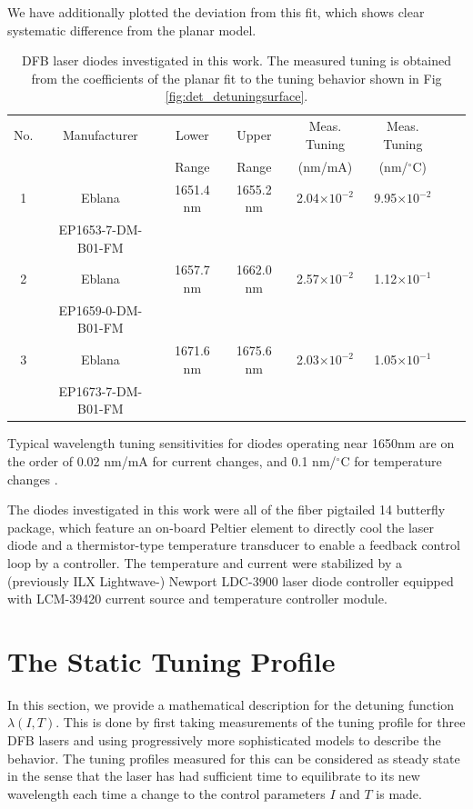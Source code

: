 \documentclass[12pt]{report}
\begin{document}
	We have additionally plotted the deviation from this fit, which shows clear systematic difference from the planar model.
	
	\begin{table}[H] 
		\begin{center}
			\caption{DFB laser diodes investigated in this work. The measured tuning is obtained from the coefficients of the planar fit to the tuning behavior shown in Fig \ref{fig:det_detuningsurface}.}\label{table:diodes}
			\begin{tabular}{|c|c|c|c|c|c|c|c|}
				\hline
				No. & Manufacturer & Lower & Upper  & Meas. Tuning & Meas. Tuning \\
				& & Range & Range & (nm/mA) & (nm/$^\circ$C) \\
				\hline
				1 & Eblana & 1651.4 nm & 1655.2 nm & 2.04$\times10^{-2}$ & 9.95$\times10^{-2}$ \\
				 & EP1653-7-DM-B01-FM & & & &  \\
				\hline
				2 & Eblana & 1657.7 nm & 1662.0 nm & 2.57$\times10^{-2}$ & 1.12$\times10^{-1}$ \\
				& EP1659-0-DM-B01-FM & & & &  \\
				\hline
				3 & Eblana & 1671.6 nm & 1675.6 nm & 2.03$\times10^{-2}$ & 1.05$\times10^{-1}$ \\
				& EP1673-7-DM-B01-FM & & & &  \\
				\hline
			\end{tabular}
		\end{center}
	\end{table}
	
	
	Typical wavelength tuning sensitivities for diodes operating near 1650nm are on the order of 0.02 nm/mA for current changes, and 0.1 nm/$^\circ$C for temperature changes \cite{crds_co2_scanning_noaom}.
	
	The diodes investigated in this work were all of the fiber pigtailed 14 butterfly package, which feature an on-board Peltier element to directly cool the laser diode and a thermistor-type temperature transducer to enable a feedback control loop by a controller. The temperature and current were stabilized by a (previously ILX Lightwave-) Newport LDC-3900 laser diode controller equipped with LCM-39420 current source and temperature controller module.
	
	\section{The Static Tuning Profile}
	In this section, we provide a mathematical description for the detuning function $\lambda(I,T)$. This is done by first taking measurements of the tuning profile for three DFB lasers and using progressively more sophisticated models to describe the behavior. The tuning profiles measured for this can be considered as steady state in the sense that the laser has had sufficient time to equilibrate to its new wavelength each time a change to the control parameters $I$ and $T$ is made.
	
\end{document}
